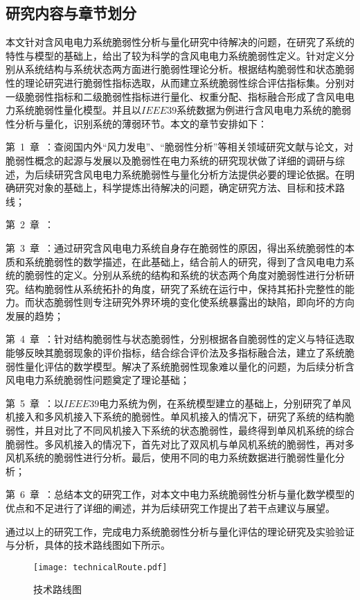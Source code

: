 \subsection{研究内容与章节划分}
\label{sec:contendAndIdea}
本文针对含风电电力系统脆弱性分析与量化研究中待解决的问题，在研究了系统的特性与模型的基础上，给出了较为科学的含风电电力系统脆弱性定义。针对定义分别从系统结构与系统状态两方面进行脆弱性理论分析。根据结构脆弱性和状态脆弱性的理论研究进行脆弱性指标选取，从而建立系统脆弱性综合评估指标集。分别对一级脆弱性指标和二级脆弱性指标进行量化、权重分配、指标融合形成了含风电电力系统脆弱性量化模型。并且以$IEEE39$系统数据为例进行含风电电力系统的脆弱性分析与量化，识别系统的薄弱环节。本文的章节安排如下：

第~1~章~：查阅国内外“风力发电”、“脆弱性分析”等相关领域研究文献与论文，对脆弱性概念的起源与发展以及脆弱性在电力系统的研究现状做了详细的调研与综述，为后续研究含风电电力系统脆弱性与量化分析方法提供必要的理论依据。在明确研究对象的基础上，科学提炼出待解决的问题，确定研究方法、目标和技术路线；

第~2~章~：

第~3~章~：通过研究含风电电力系统自身存在脆弱性的原因，得出系统脆弱性的本质和系统脆弱性的数学描述，在此基础上，结合前人的研究，得到了含风电电力系统的脆弱性的定义。分别从系统的结构和系统的状态两个角度对脆弱性进行分析研究。结构脆弱性从系统拓扑的角度，研究了系统在运行中，保持其拓扑完整性的能力。而状态脆弱性则专注研究外界环境的变化使系统暴露出的缺陷，即向坏的方向发展的趋势；

第~4~章~：针对结构脆弱性与状态脆弱性，分别根据各自脆弱性的定义与特征选取能够反映其脆弱现象的评价指标，结合综合评价法及多指标融合法，建立了系统脆弱性量化评估的数学模型。解决了系统脆弱性现象难以量化的问题，为后续分析含风电电力系统脆弱性问题奠定了理论基础；

第~5~章~：以$IEEE39$电力系统为例，在系统模型建立的基础上，分别研究了单风机接入和多风机接入下系统的脆弱性。单风机接入的情况下，研究了系统的结构脆弱性，并且对比了不同风机接入下系统的状态脆弱性，最终得到单风机系统的综合脆弱性。多风机接入的情况下，首先对比了双风机与单风机系统的脆弱性，再对多风机系统的脆弱性进行分析。最后，使用不同的电力系统数据进行脆弱性量化分析；

第~6~章~：总结本文的研究工作，对本文中电力系统脆弱性分析与量化数学模型的优点和不足进行了详细的阐述，并为后续研究工作提出了若干点建议与展望。

通过以上的研究工作，完成电力系统脆弱性分析与量化评估的理论研究及实验验证与分析，具体的技术路线图如下所示。
\begin{figure}[H] %
  \centering
  \texttt{[image: technicalRoute.pdf]}
  \caption{技术路线图}
  \label{fig:technicalRoute}
\end{figure}
